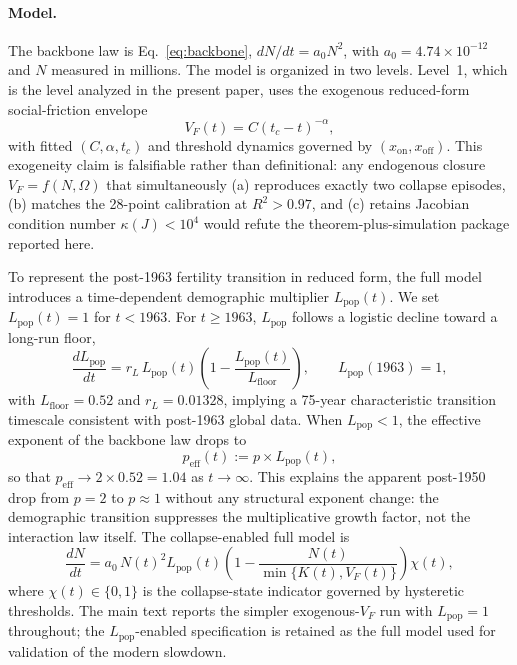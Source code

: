\documentclass[11pt]{article}
\begin{document}
\paragraph{Model.}
The backbone law is Eq.~\eqref{eq:backbone},
\(dN/dt=a_0N^2\),
with
\(a_0=4.74\times 10^{-12}\)
and
\(N\)
measured in millions.
The model is organized in two levels.
Level~1,
which is the level analyzed in the present paper,
uses the exogenous reduced-form social-friction envelope
\begin{equation}
V_F(t)=C(t_c-t)^{-\alpha},
\end{equation}
with fitted
\((C,\alpha,t_c)\)
and threshold dynamics governed by
\((x_{\mathrm{on}},x_{\mathrm{off}})\).
This exogeneity claim is falsifiable rather than definitional:
any endogenous closure
\(V_F=f(N,\Omega)\)
that simultaneously
(a) reproduces exactly two collapse episodes,
(b) matches the 28-point calibration at
\(R^2>0.97\),
and
(c) retains Jacobian condition number
\(\kappa(J)<10^4\)
would refute the theorem-plus-simulation package reported here.

To represent the post-1963 fertility transition in reduced form,
the full model introduces a time-dependent demographic multiplier
\(L_{\mathrm{pop}}(t)\).
We set
\(L_{\mathrm{pop}}(t)=1\)
for
\(t<1963\).
For
\(t\ge 1963\),
\(L_{\mathrm{pop}}\)
follows a logistic decline toward a long-run floor,
\begin{equation}
\frac{dL_{\mathrm{pop}}}{dt}
=r_L\,L_{\mathrm{pop}}(t)\!\left(1-\frac{L_{\mathrm{pop}}(t)}{L_{\mathrm{floor}}}\right),
\qquad
L_{\mathrm{pop}}(1963)=1,
\label{eq:lpop_ode}
\end{equation}
with
\(L_{\mathrm{floor}}=0.52\)
and
\(r_L=0.01328\),
implying a 75-year characteristic transition timescale consistent with post-1963 global data.
When
\(L_{\mathrm{pop}}<1\),
the effective exponent of the backbone law drops to
\begin{equation}
p_{\mathrm{eff}}(t):=p\times L_{\mathrm{pop}}(t),
\label{eq:peff}
\end{equation}
so that
\(p_{\mathrm{eff}}\to 2\times 0.52=1.04\)
as
\(t\to\infty\).
This explains the apparent post-1950 drop from
\(p=2\)
to
\(p\approx 1\)
without any structural exponent change:
the demographic transition suppresses the multiplicative growth factor,
not the interaction law itself.
The collapse-enabled full model is
\begin{equation}
\frac{dN}{dt}
=a_0\,N(t)^2L_{\mathrm{pop}}(t)
\left(1-\frac{N(t)}{\min\{K(t),V_F(t)\}}\right)\chi(t),
\label{eq:full_model}
\end{equation}
where
\(\chi(t)\in\{0,1\}\)
is the collapse-state indicator governed by hysteretic thresholds.
The main text reports the simpler exogenous-\(V_F\) run with
\(L_{\mathrm{pop}}=1\)
throughout;
the
\(L_{\mathrm{pop}}\)-enabled specification is retained as the full model used for validation of the modern slowdown.
\end{document}
